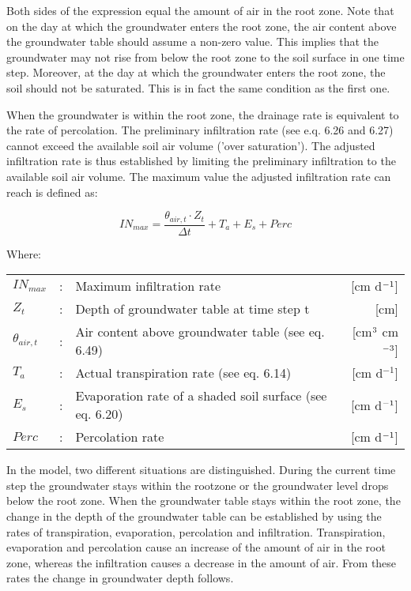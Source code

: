 Both sides of the expression equal the amount of air in the root zone. Note that on the
day at which the groundwater enters the root zone, the air content above the groundwater
table should assume a non-zero value. This implies that the groundwater may not rise
from below the root zone to the soil surface in one time step. Moreover, at the day at
which the groundwater enters the root zone, the soil should not be saturated. This is in
fact the same condition as the first one. 

When the groundwater is within the root zone, the drainage rate is equivalent to the rate
of percolation. The preliminary infiltration rate (see e.q. 6.26 and 6.27) cannot exceed
the available soil air volume ('over saturation'). The adjusted infiltration rate is thus
established by limiting the preliminary infiltration to the available soil air volume. The
maximum value the adjusted infiltration rate can reach is defined as:

\begin{equation}
IN_{max} = {\frac{\theta_{air,t} \cdot Z _{t}}{\Delta t}} + T_{a} + E_{s} + Perc
\end{equation}

Where:\\[5pt]
\begin{tabularx}{\textwidth}{llXr}
$IN_{max}$ &:& Maximum infiltration rate  & [cm d$^{{\rm -1}}$]\\
$Z_{t}$ &:& Depth of groundwater table at time step t  & [cm]\\
$\theta_{air,t}$ &:& Air content above groundwater table (see eq. 6.49)  & [cm$^{{\rm 3}}$ cm$^{{\rm -3}}$]\\
$T_{a}$ &:& Actual transpiration rate (see eq. 6.14)  & [cm d$^{-1}$]\\
$E_{s}$ &:& Evaporation rate of a shaded soil surface (see eq. 6.20)  & [cm d$^{{\rm -1}}$]\\
$Perc$ &:& Percolation rate  & [cm d$^{{\rm -1}}$]\\
\end{tabularx}

In the model, two different situations are distinguished. During the current time step the
ground\-water stays within the rootzone or the groundwater level drops below the root
zone. When the groundwater table stays within the root zone, the change in the depth of
the groundwater table can be established by using the rates of transpiration, evaporation,
percolation and infiltration. Transpiration, evaporation and percolation cause an increase
of the amount of air in the root zone, whereas the infiltration causes a decrease in the
amount of air. From these rates the change in groundwater depth follows. 

